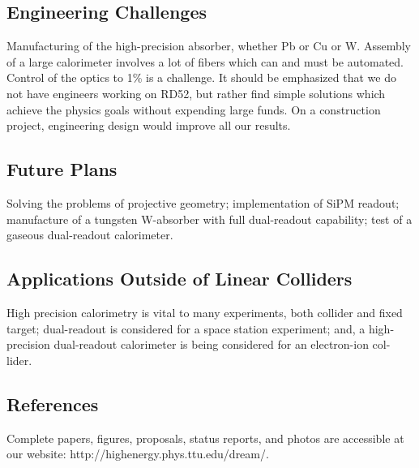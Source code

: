 \subsection{Engineering Challenges}
Manufacturing of the high-precision absorber, whether Pb or Cu or W. Assembly of a large calorimeter involves a lot of fibers which can and must be automated. Control of the optics to 1\% is a challenge. It should be emphasized that we do not have engineers working on RD52, but rather find simple solutions which achieve the physics goals without expending large funds. On a construction project, engineering design would improve all our results.
\subsection{Future Plans}
Solving the problems of projective geometry; implementation of SiPM readout; manufacture of a tungsten W-absorber with full dual-readout capability; test of a gaseous dual-readout calorimeter.
\subsection{Applications Outside of Linear Colliders}
High precision calorimetry is vital to many experiments, both collider and fixed target; dual-readout is considered for a space station experiment; and, a high-precision dual-readout calorimeter is being considered for an electron-ion col- lider.
\subsection{References}
Complete papers, figures, proposals, status reports, and photos are accessible at our website: http://highenergy.phys.ttu.edu/dream/.